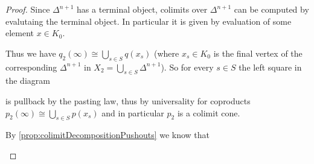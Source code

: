 \begin{lemma}
\begin{proof}
        Since $\Delta^{n+1}$ has a terminal object, colimits over $\Delta^{n+1}$ can be computed by evalutaing the terminal object.
        In particular it is given by evaluation of some element $x\in K_0$.

        Thus we have $q_2(\infty)\cong\bigcup\limits_{s\in S} q(x_s)$ (where $x_s\in K_0$ is the final vertex of the corresponding $\Delta^{n+1}$ in $X_2=\bigcup\limits_{s\in S} \Delta^{n+1}$).
        So for every $s\in S$ the left square in the diagram
        \begin{center}
        \end{center}
        is pullback by the pasting law, thus by universality for coproducts $p_2(\infty)\cong\bigcup\limits_{s\in S} p(x_s)$ and in particular $p_2$ is a colimit cone.
        
        By \cref{prop:colimitDecompositionPushouts} we know that 
        \begin{center}
\end{center}
\end{proof}
\end{lemma}
